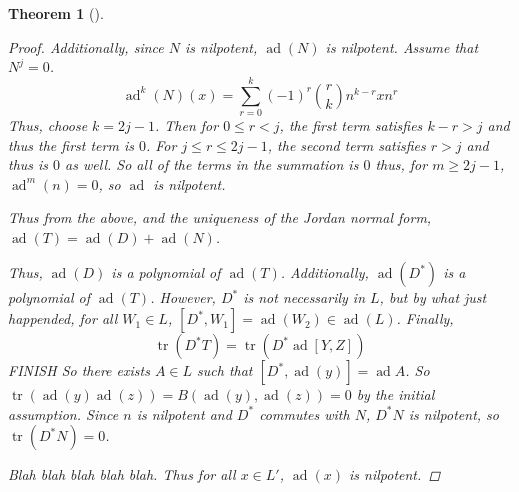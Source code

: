 \documentclass[letterpaper, 10pt]{article}
\theoremstyle{theostyle}
\newtheorem{theorem}{Theorem}[section]
\newenvironment{thmstyle}[1][]{%
    \begin{theorem}[#1]\leavevmode\vspace{-\baselineskip}\myquote%
    }{\endmyquote\end{theorem}}
\begin{document}
\begin{thmstyle}
\begin{proof}
    Additionally, since \(N\) is nilpotent, \(\operatorname{ad}{(N)}\) is nilpotent.
    Assume that \(N^j = 0\).
    \[\operatorname{ad}^k{(N)}(x) = \sum_{r = 0}^{k} (-1)^{r} \binom{r}{k} n^{k - r} x n^{r}\]
    Thus, choose \(k = 2j - 1\).
    Then for \(0 \leq r < j\), the first term satisfies \(k-r > j\) and thus the first term is \(0\).
    For \(j \leq r \leq 2j - 1\), the second term satisfies \(r > j\) and thus is \(0\) as well.
    So all of the terms in the summation is \(0\) thus, for \(m \geq 2j - 1\), \(\operatorname{ad}^m{(n)} = 0\), so \(\operatorname{ad}\) is nilpotent.

    Thus from the above, and the uniqueness of the Jordan normal form,
    \(\operatorname{ad}{(T)} = \operatorname{ad}{(D)} + \operatorname{ad}{(N)}\).

    Thus, \(\operatorname{ad}{(D)}\) is a polynomial of \(\operatorname{ad}{(T)}\).
    Additionally, \(\operatorname{ad}{(D^\ast)}\) is a polynomial of \(\operatorname{ad}{(T)}\).
    However, \(D^\ast\) is not necessarily in \(L\), but by what just happended, for all \(W_1 \in L\), \([D^\ast, W_1] = \operatorname{ad}{(W_2)} \in \operatorname{ad}{(L)}\).
    Finally,
    \[\operatorname{tr}{(D^\ast T)} = \operatorname{tr}{(D^\ast \operatorname{ad}{[Y,Z]})} \]
    FINISH
    So there exists \(A \in L\) such that \([D^\ast, \operatorname{ad}{(y)}] = \operatorname{ad}{A}\).
    So \(\operatorname{tr}{(\operatorname{ad}{(y)} \operatorname{ad}{(z)})} = B(\operatorname{ad}{(y)},\operatorname{ad}{(z)}) = 0\) by the initial assumption.
    Since \(n\) is nilpotent and \(D^\ast\) commutes with \(N\), \(D^\ast N\) is nilpotent, so \(\operatorname{tr}{(D^\ast N)} = 0\).


    Blah blah blah blah blah.
    Thus for all \(x \in L'\), \(\operatorname{ad}{(x)}\) is nilpotent.

    \end{proof}
\end{thmstyle}
\end{document}
